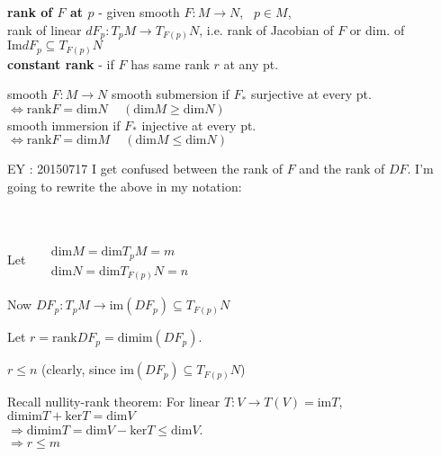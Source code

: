 \textbf{rank of $F$ at $p$ } - given smooth $F: M \to N$, \, $p\in M$, \\
\quad rank of linear $dF_p : T_pM \to T_{F(p)}N$, i.e. rank of Jacobian of $F$ or dim. of $\text{Im}{ dF_p} \subseteq T_{F(p)}N$ \\
\textbf{constant rank } - if $F$ has same rank $r$ at any pt. 

smooth $F:M \to N$ smooth submersion if $F_*$ surjective at every pt.  $\Longleftrightarrow \text{rank}{F} = \text{dim}{N} \quad \, (\text{dim}{M} \geq \text{dim}{N})$ \\
\phantom{smooth $F:M \to N$} smooth immersion if $F_*$ injective at every pt. $\Longleftrightarrow \text{rank}{F} = \text{dim}{M} \quad \, (\text{dim}{M} \leq \text{dim}{N})$


EY : 20150717 I get confused between the rank of $F$ and the rank of $DF$.  I'm going to rewrite the above in my notation:


 \quad \quad \quad \, 

Let \quad \, $\begin{aligned} & \quad \\
 &  \text{dim}M = \text{dim}T_pM = m \\
 &  \text{dim}N = \text{dim}T_{F(p)}N = n 
\end{aligned}$

Now $DF_p : T_pM \to \text{im}(DF_p) \subseteq T_{F(p)}N$

Let $r = \text{rank}DF_p = \text{dim}\text{im}(DF_p)$.  

$r\leq n$ (clearly, since $\text{im}(DF_p) \subseteq T_{F(p)}N$)

Recall nullity-rank theorem: For linear $T: V \to T(V) = \text{im}T$, \\
\phantom{Recall} $\text{dim}\text{im}T + \text{ker}T = \text{dim}V$ \\
\phantom{Recall} $\Longrightarrow \text{dim}\text{im}T = \text{dim}V - \text{ker}T \leq \text{dim}V$.  \\
$\Longrightarrow r \leq m$

